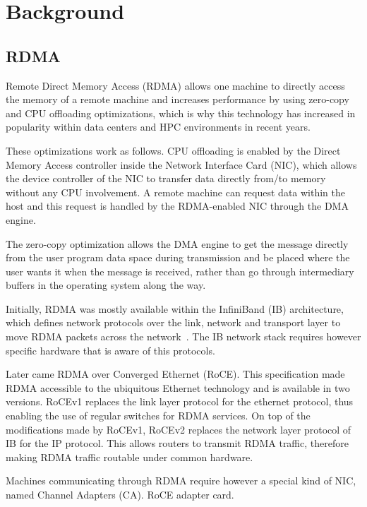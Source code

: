 \section{Background}



\subsection{RDMA}

Remote Direct Memory Access (RDMA) allows one machine to
directly access the memory of a remote machine and increases
performance by using  zero-copy and CPU offloading optimizations\cite{keyvalueservices},
which is why this technology has increased in popularity
within data centers and HPC environments in recent years.

These optimizations work as follows. CPU offloading is enabled by
the Direct Memory Access controller inside the Network Interface Card (NIC), which
allows the device controller of the NIC to transfer data directly from/to memory without
any CPU involvement\cite{comparchbook}. A remote machine can request data within the host and this
request is handled by the RDMA-enabled NIC through the DMA engine.

The zero-copy optimization allows the DMA engine to get
the message directly from the user program data space during transmission
and be placed where the user wants it when the message is received,
rather than go through intermediary buffers in the operating system
along the way\cite{comparchbook}.

Initially, RDMA was mostly available within the InfiniBand (IB) architecture,
which defines network protocols over the link, network and transport layer to move
RDMA packets across the network~\cite{ibta}. The IB network stack requires however
specific hardware that is aware of this protocols.

Later came RDMA over Converged Ethernet (RoCE). This specification
made RDMA accessible to the ubiquitous Ethernet technology and is available
in two versions. RoCEv1 replaces the link layer protocol for the ethernet protocol,
thus enabling the use of regular switches for RDMA services. On top of the modifications
made by RoCEv1, RoCEv2 replaces the network layer protocol of IB for the IP protocol. This
allows routers to transmit RDMA traffic, therefore making RDMA traffic routable under
common hardware.

Machines communicating through RDMA require however a special kind of NIC,
named Channel Adapters (CA). RoCE adapter card.



